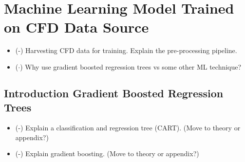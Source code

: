 
\section{Machine Learning Model Trained on CFD Data Source}

\begin{itemize}
	\item (\checkmark-) Harvesting CFD data for training. Explain the pre-processing pipeline.
	\item ($\cdot$) Why use gradient boosted regression trees vs some other ML technique?
\end{itemize}

\subsection{Introduction Gradient Boosted Regression Trees}
\begin{itemize}
	\item (\checkmark-) Explain a classification and regression tree (CART).  (Move to theory or appendix?)
	\item (\checkmark-) Explain gradient boosting.  (Move to theory or appendix?)
    
    
\end{itemize}

